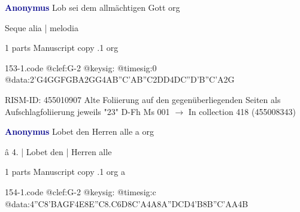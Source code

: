 \documentclass[twocolumn]{book}
\begin{document}
\newline \par \vspace{7pt} \textcolor{darkblue}{\textbf{Anonymus  }}
\newline Lob sei dem allmächtigen Gott    
\newline org
\newline \begin{itshape}[f.23r, at right:] Seque alia | melodia\end{itshape} 
\newline \textcolor{darkblue}{}  1 parts  
\newline Manuscript copy
.1  org  
\begin{filecontents*}{153-1.code}
@clef:G-2
@keysig:
@timesig:0
@data:2'G4GGFGBA2GG4AB''C'AB''C2DD4DC''D'B''C'A2G
\end{filecontents*}
\newline
%

\newline RISM-ID: 455010907
\newline Alte Foliierung auf den gegenüberliegenden Seiten als Aufschlagfoliierung jeweils "23"
\newline D-Fh  Ms 001
\newline $\rightarrow$ In collection 418 (455008343)

\newline \par \vspace{7pt} \textcolor{darkblue}{\textbf{Anonymus  }}
\newline Lobet den Herren alle  a  
\newline org
\newline \begin{itshape}[f.65r, at left:] â 4. | Lobet den | Herren alle\end{itshape} 
\newline \textcolor{darkblue}{}  1 parts  
\newline Manuscript copy
.1  org  a  
\begin{filecontents*}{154-1.code}
@clef:G-2
@keysig:
@timesig:c
@data:4''C{8'BA}{GF}4E{8E''C8.C6D}{8C'A}4A{8A''DCD}4'B{8B''C}{'AA}4B
\end{filecontents*}
\newline
%
\end{document}
